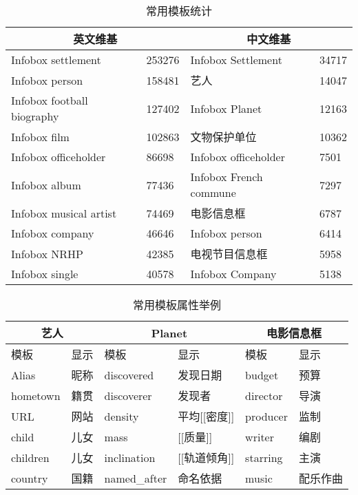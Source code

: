 \begin{table}[htb]
  \centering
  \caption{常用模板统计}
  \label{tab:template-examples}
  \begin{minipage}[t]{1\textwidth} 
    \begin{tabularx}{\linewidth}{XXXX}
      \toprule[1.5pt]
        \multicolumn{2}{c}{英文维基}   & \multicolumn{2}{c}{中文维基} \\ \midrule[1pt]
       Infobox settlement   & 253276 & Infobox Settlement & 34717 \\
       Infobox person       & 158481 & 艺人 & 14047 \\
       Infobox football biography & 127402 & Infobox Planet& 12163 \\
       Infobox film         & 102863 & 文物保护单位& 10362 \\
       Infobox officeholder & 86698 & Infobox officeholder& 7501\\
       Infobox album        & 77436 & Infobox French commune& 7297\\
       Infobox musical artist & 74469 & 电影信息框& 6787 \\
       Infobox company      & 46646 & Infobox person& 6414 \\
       Infobox NRHP         & 42385 & 电视节目信息框& 5958\\
       Infobox single       & 40578 & Infobox Company& 5138 \\
      \bottomrule[1.5pt]
    \end{tabularx}
  \end{minipage}
\end{table}

\begin{table}[htb]
  \centering
  \caption{常用模板属性举例}
  \label{tab:template-property-examples}
  \begin{minipage}[t]{1\textwidth} 
    \begin{tabularx}{\linewidth}{XXXXXX}
      \toprule[1.5pt]
        \multicolumn{2}{c}{艺人}  & \multicolumn{2}{c}{Planet} & \multicolumn{2}{c}{电影信息框}\\ \midrule[1pt]
        模板& 显示 & 模板& 显示& 模板& 显示\\
        Alias & 昵称      & discovered & 发现日期      & budget & 预算 \\
        hometown& 籍贯    & discoverer & 发现者        & director & 导演\\
        URL& 网站         & density & 平均[[密度]]     & producer& 监制 \\
        child& 儿女       & mass & [[质量]]            & writer & 编剧\\
        children& 儿女    & inclination & [[轨道倾角]] & starring & 主演\\
        country & 国籍    & named\_after& 命名依据     & music &  配乐作曲\\
      \bottomrule[1.5pt]
    \end{tabularx}
  \end{minipage}
\end{table}

